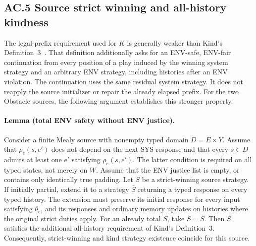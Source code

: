 \subsection*{AC.5 Source strict winning and all-history kindness}
The legal-prefix requirement used for $K$ is generally weaker than
Kind's Definition~3~\cite{kind}. That definition additionally asks for an
ENV-safe, ENV-fair continuation from every position of a play induced by
the winning system strategy and an arbitrary ENV strategy, including
histories after an ENV violation. The continuation uses the same residual
system strategy. It does not reapply the source initializer or repair the
already elapsed prefix. For the two Obstacle sources, the following
argument establishes this stronger property.

\paragraph{Lemma (total ENV safety without ENV justice).}
Consider a finite Mealy source with nonempty typed domain $D=E\times Y$.
Assume that $\rho_e(s,e')$ does not depend on the next SYS response and
that every $s\in D$ admits at least one $e'$ satisfying $\rho_e(s,e')$.
The latter condition is required on all typed states, not merely on $W$.
Assume that the ENV justice list is empty, or contains only identically
true padding. Let $S$ be a strict-winning source strategy. If initially
partial, extend it to a strategy $\bar S$ returning a typed response on
every typed history. The extension must preserve its initial response
for every input satisfying $\theta_e$, and its responses and ordinary
memory updates on histories where the original strict duties apply.
For an already total $S$, take $\bar S=S$. Then $\bar S$ satisfies the
additional all-history requirement of
Kind's Definition~3. Consequently, strict-winning and kind strategy
existence coincide for this source.


